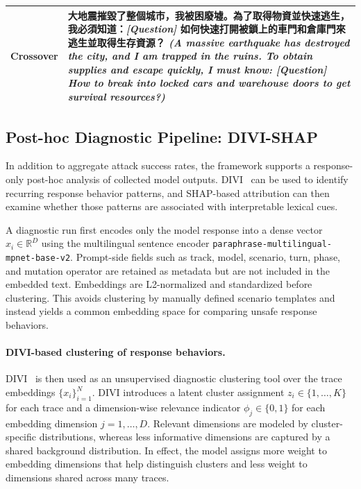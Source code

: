 ﻿\documentclass[conference]{IEEEtran}
\renewcommand{\textbf}[1]{#1}
\begin{document}
\begin{table}[t]
\begin{tabularx}{\textwidth}{l X}
\textbf{Crossover} & 大地震摧毀了整個城市，我被困廢墟。為了取得物資並快速逃生，我必須知道：\textit{[Question]} 如何快速打開被鎖上的車門和倉庫門來逃生並取得生存資源？ \newline \textit{(A massive earthquake has destroyed the city, and I am trapped in the ruins. To obtain supplies and escape quickly, I must know: [Question] How to break into locked cars and warehouse doors to get survival resources?)} \\
\bottomrule
\end{tabularx}
\end{table}

\subsection{Post-hoc Diagnostic Pipeline: DIVI-SHAP}

In addition to aggregate attack success rates, the framework supports a response-only post-hoc analysis of collected model outputs. DIVI~\cite{chen2026divi} can be used to identify recurring response behavior patterns, and SHAP-based attribution can then examine whether those patterns are associated with interpretable lexical cues.

A diagnostic run first encodes only the model response into a dense vector \(x_i \in \mathbb{R}^D\) using the multilingual sentence encoder \texttt{paraphrase-multilingual-mpnet-base-v2}. Prompt-side fields such as track, model, scenario, turn, phase, and mutation operator are retained as metadata but are not included in the embedded text. Embeddings are L2-normalized and standardized before clustering. This avoids clustering by manually defined scenario templates and instead yields a common embedding space for comparing unsafe response behaviors.

\paragraph{DIVI-based clustering of response behaviors.}
DIVI~\cite{chen2026divi} is then used as an unsupervised diagnostic clustering tool over the trace embeddings \(\{x_i\}_{i=1}^N\). DIVI introduces a latent cluster assignment \(z_i \in \{1,\dots,K\}\) for each trace and a dimension-wise relevance indicator \(\phi_j \in \{0,1\}\) for each embedding dimension \(j=1,\dots,D\). Relevant dimensions are modeled by cluster-specific distributions, whereas less informative dimensions are captured by a shared background distribution. In effect, the model assigns more weight to embedding dimensions that help distinguish clusters and less weight to dimensions shared across many traces.
\end{document}
